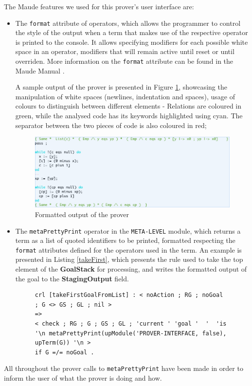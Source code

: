 \documentclass[12pt,a4paper]{article}
\begin{document}
The Maude features we used for this prover's user interface are:
\begin{itemize}
	\item The \texttt{format} attribute of operators, which allows the programmer to control the style of the output when a term that makes use of the respective operator is printed to the console. It allows specifying modifiers for each possible white space in an operator, modifiers that will remain active until reset or until overriden. More information on the \texttt{format} attribute can be found in the Maude Manual \cite{manual}. 
	
	A sample output of the prover is presented in Figure \ref{fig:CLIScreenShot}, showcasing the manipulation of white spaces (newlines, indentation and spaces), usage of colours to distinguish between different elements - Relations are coloured in green, while the analysed code has its keywords highlighted using cyan. The separator between the two pieces of code is also coloured in red;
	\begin{figure}[h]
		\includegraphics[width=\linewidth]{pictures/bg_white.png}
		\caption{Formatted output of the prover}
		\label{fig:CLIScreenShot}
	\end{figure}
	\item The \texttt{metaPrettyPrint} operator in the \texttt{META-LEVEL} module, which returns a term as a list of quoted identifiers to be printed, formatted respecting the \texttt{format} attributes defined for the operators used in the term. An example is presented in Listing \ref{takeFirst}, which presents the rule used to take the top element of the \textbf{GoalStack} for processing, and writes the formatted output of the goal to the \textbf{StagingOutput} field.
	\begin{figure}[h]
	\begin{lstlisting}[label=takeFirst,caption=Rewrite rule making use of metaPrettyPrint]
crl [takeFirstGoalFromList] : < noAction ; RG ; noGoal ; G <> GS ; GL ; nil > 
=> 
< check ; RG ; G ; GS ; GL ; 'current ' 'goal '  '  'is '\n metaPrettyPrint(upModule('PROVER-INTERFACE, false), upTerm(G)) '\n > 
if G =/= noGoal .
	\end{lstlisting}
	\end{figure}
\end{itemize}
All throughout the prover calls to \texttt{metaPrettyPrint} have been made in order to inform the user of what the prover is doing and how.
\\
\end{document}
